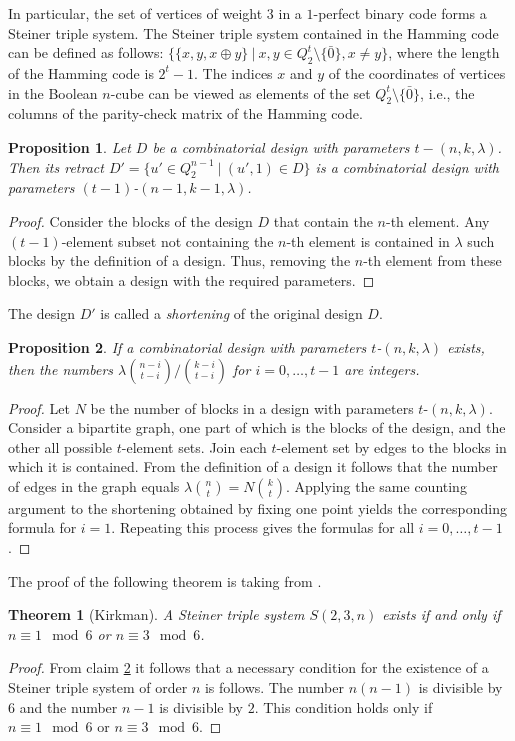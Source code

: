\documentclass[11pt]{article}
\newtheorem{theorem}{Theorem}[section]
\newtheorem{claim}{Proposition}[section]
\theoremstyle{definition}
\begin{document}
{{{In particular, the set of vertices of weight $3$ in a $1$-perfect binary
code forms a Steiner triple system. The Steiner triple system
contained in the Hamming code can be defined as follows:
$\{\{x,y,x\oplus y\} \ |\ x,y\in Q^t_2\setminus \{\bar{0}\}, x\neq
y\}$, where the length of the Hamming code is $2^t-1$. The indices $x$ and $y$
of the coordinates of vertices in the  Boolean $n$-cube 
can be viewed as elements of the set $Q^t_2\setminus
\{\bar{0}\}$, i.e.,
 the columns of the parity-check matrix of the Hamming code.

\begin{claim}\label{claim:DesRet}
Let $D$ be a combinatorial design with parameters $t-(n,k,\lambda)$.
Then its retract $D'=\{u'\in Q^{n-1}_2 \ | \ (u',1)\in D\}$
is a combinatorial design with parameters
$(t-1)$-$(n-1,k-1,\lambda)$.
\end{claim}
\begin{proof}
Consider the blocks of the design $D$ that contain the $n$-th element.
Any $(t-1)$-element subset not containing the $n$-th element
is contained in $\lambda$ such blocks by the definition of a design. Thus,
removing the $n$-th element from these blocks, we obtain a design with
the required parameters.
\end{proof}

The design $D'$ is called a {\sl shortening} of the original design $D$.

\begin{claim}\label{c:conddesign}
If a combinatorial design with parameters $t$-$(n,k,\lambda)$
exists, then the numbers $\lambda{{n-i} \choose {t-i}}/{{k-i} \choose
{t-i}}$ for $i=0,\dots,t-1$ are integers.
\end{claim}
\begin{proof}
Let $N$ be the number of blocks in a design with parameters
$t$-$(n,k,\lambda)$. Consider a bipartite graph, one part of
which is the blocks of the design, and the other all possible
$t$-element sets. Join each $t$-element set by edges
to the blocks in which it is contained. From the definition of a design it follows that
the number of edges in the graph equals $\lambda{{n} \choose {t}}=N{{k}
\choose {t}}$. 
Applying the same counting argument to the shortening obtained by fixing one point yields the corresponding formula for $i=1$. Repeating this process gives the formulas for all $i=0,\dots,t-1$.
\end{proof}
 The proof of the following theorem is taking from \cite{Rosa}.

\begin{theorem}[Kirkman]\label{th:STS}
A Steiner triple system $S(2,3,n)$ exists if and only
if $n\equiv 1\mod 6$ or $n\equiv 3\mod 6$.
\end{theorem}
\begin{proof}
From claim \ref{c:conddesign} it follows that a necessary condition
for the existence of a Steiner triple system of order $n$ is follows. 
The number $n(n-1)$ is divisible by $6$ and the number $n-1$ is divisible by $2$. This condition holds
only if $n\equiv 1\mod 6$ or $n\equiv 3\mod 6$.


\end{proof}}}}
\end{document}
